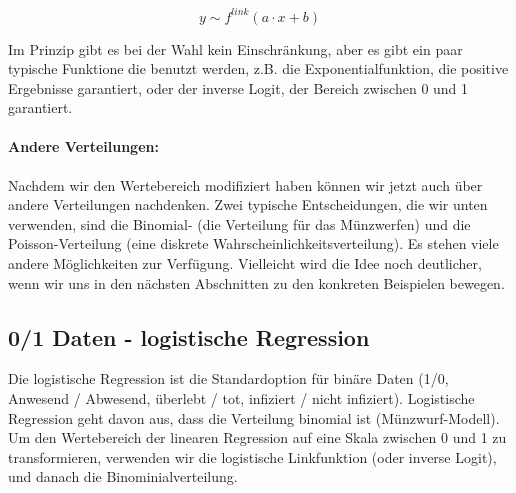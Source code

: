 \documentclass[a4paper,twoside]{tufte-book}\usepackage[]{graphicx}\usepackage[]{color}
\begin{document}
\begin{equation}
y \sim f^{link}(a \cdot x + b )
\end{equation}

Im Prinzip gibt es bei der Wahl kein Einschränkung, aber es gibt ein paar typische Funktione die benutzt werden, z.B. die Exponentialfunktion, die positive Ergebnisse garantiert, oder der inverse Logit, der Bereich zwischen 0 und 1 garantiert.

\paragraph{Andere Verteilungen:} Nachdem wir den Wertebereich modifiziert haben können wir jetzt auch über andere Verteilungen nachdenken. Zwei typische Entscheidungen, die wir unten verwenden, sind die Binomial- (die Verteilung für das Münzwerfen) und die Poisson-Verteilung (eine diskrete Wahrscheinlichkeitsverteilung). Es stehen viele andere Möglichkeiten zur Verfügung. Vielleicht wird die Idee noch deutlicher, wenn wir uns in den nächsten Abschnitten zu den konkreten Beispielen bewegen.

\subsection{0/1 Daten - logistische Regression}

Die logistische Regression ist die Standardoption für binäre Daten (1/0, Anwesend / Abwesend, überlebt / tot, infiziert / nicht infiziert). Logistische Regression geht davon aus, dass die Verteilung binomial ist (Münzwurf-Modell). Um den Wertebereich der linearen Regression auf eine Skala zwischen 0 und 1 zu transformieren, verwenden wir die logistische Linkfunktion (oder inverse Logit), und danach die Binominialverteilung.
\end{document}
